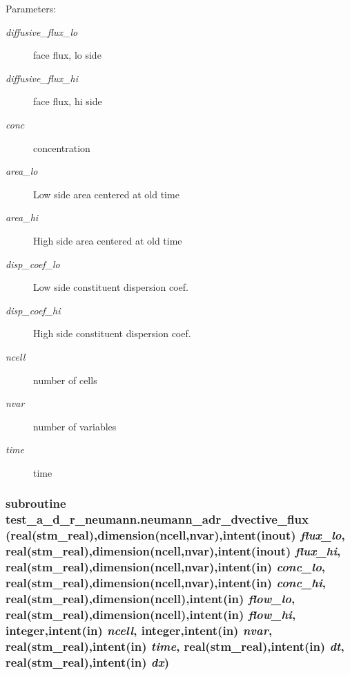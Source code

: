 \begin{Desc}
\item[Parameters:]
\begin{description}
\item[{\em diffusive\_\-flux\_\-lo}]face flux, lo side\item[{\em diffusive\_\-flux\_\-hi}]face flux, hi side\item[{\em conc}]concentration \item[{\em area\_\-lo}]Low side area centered at old time\item[{\em area\_\-hi}]High side area centered at old time\item[{\em disp\_\-coef\_\-lo}]Low side constituent dispersion coef.\item[{\em disp\_\-coef\_\-hi}]High side constituent dispersion coef.\item[{\em ncell}]number of cells\item[{\em nvar}]number of variables\item[{\em time}]time \end{description}
\end{Desc}
\hypertarget{a00073_9163250ea77d1da6ca6c76251c24060e}{
\subsubsection[{neumann\_\-adr\_\-dvective\_\-flux}]{\setlength{\rightskip}{0pt plus 5cm}subroutine test\_\-a\_\-d\_\-r\_\-neumann.neumann\_\-adr\_\-dvective\_\-flux (real(stm\_\-real),dimension(ncell,nvar),intent(inout) {\em flux\_\-lo}, \/  real(stm\_\-real),dimension(ncell,nvar),intent(inout) {\em flux\_\-hi}, \/  real(stm\_\-real),dimension(ncell,nvar),intent(in) {\em conc\_\-lo}, \/  real(stm\_\-real),dimension(ncell,nvar),intent(in) {\em conc\_\-hi}, \/  real(stm\_\-real),dimension(ncell),intent(in) {\em flow\_\-lo}, \/  real(stm\_\-real),dimension(ncell),intent(in) {\em flow\_\-hi}, \/  integer,intent(in) {\em ncell}, \/  integer,intent(in) {\em nvar}, \/  real(stm\_\-real),intent(in) {\em time}, \/  real(stm\_\-real),intent(in) {\em dt}, \/  real(stm\_\-real),intent(in) {\em dx})}}
\label{a00073_9163250ea77d1da6ca6c76251c24060e}


